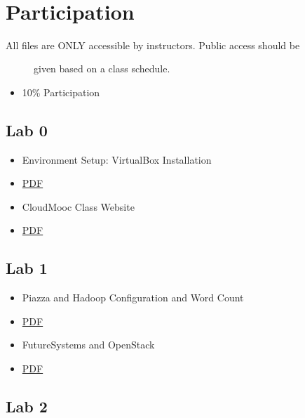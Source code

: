 \FILENAME\

\section{Participation}\label{participation}

\begin{description}
\item[All files are ONLY accessible by instructors. Public access should
be]
given based on a class schedule.
\end{description}

\begin{itemize}

\item
  10\% Participation
\end{itemize}

\subsection{Lab 0}\label{lab-0}

\begin{itemize}

\item
  Environment Setup: VirtualBox Installation
\item
  \href{https://drive.google.com/open?id=0B88HKpainTSfRFgwX0IxaWM5TFE}{PDF}
\item
  CloudMooc Class Website
\item
  \href{https://drive.google.com/open?id=0B88HKpainTSfS3hNb2tVSW9GcE0}{PDF}
\end{itemize}

\subsection{Lab 1}\label{lab-1}

\begin{itemize}

\item
  Piazza and Hadoop Configuration and Word Count
\item
  \href{https://drive.google.com/open?id=0B88HKpainTSfMzVSa1pYM0tfMzg}{PDF}
\item
  FutureSystems and OpenStack
\item
  \href{https://drive.google.com/open?id=0B88HKpainTSfNEhmeHBveXRSSUk}{PDF}
\end{itemize}

\subsection{Lab 2}\label{lab-2}

